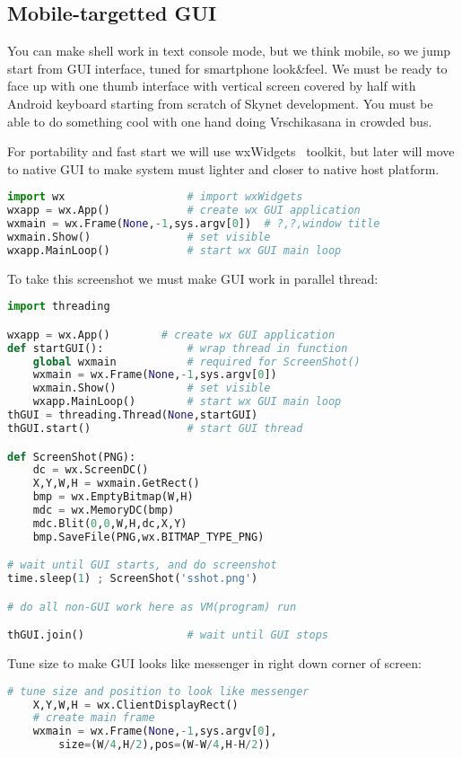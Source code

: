\clearpage
\subsection{Mobile-targetted GUI}
You can make shell work in text console mode, but we think mobile, so we jump
start from GUI interface, tuned for smartphone look\&feel. We must be ready to
face up with one thumb interface with vertical screen covered by half
with Android keyboard starting from scratch of Skynet development. You must be
able to do something cool with one hand doing Vrschikasana in crowded bus.

For portability and fast start we will use wxWidgets \cite{zetwx}\ toolkit,
but later will
move to native GUI to make system must lighter and closer to native host
platform.

\begin{lstlisting}[language=python]
import wx					# import wxWidgets
wxapp = wx.App()			# create wx GUI application
wxmain = wx.Frame(None,-1,sys.argv[0])	# ?,?,window title
wxmain.Show()				# set visible
wxapp.MainLoop()			# start wx GUI main loop
\end{lstlisting}


To take this screenshot we must make GUI work in parallel thread:
\begin{lstlisting}[language=python]
import threading

wxapp = wx.App()		# create wx GUI application
def startGUI():				# wrap thread in function
	global wxmain			# required for ScreenShot()
	wxmain = wx.Frame(None,-1,sys.argv[0])
	wxmain.Show()			# set visible
	wxapp.MainLoop()		# start wx GUI main loop
thGUI = threading.Thread(None,startGUI)
thGUI.start()				# start GUI thread

def ScreenShot(PNG):
	dc = wx.ScreenDC()
	X,Y,W,H = wxmain.GetRect()
	bmp = wx.EmptyBitmap(W,H)
	mdc = wx.MemoryDC(bmp)
	mdc.Blit(0,0,W,H,dc,X,Y)
	bmp.SaveFile(PNG,wx.BITMAP_TYPE_PNG)

# wait until GUI starts, and do screenshot
time.sleep(1) ; ScreenShot('sshot.png')

# do all non-GUI work here as VM(program) run

thGUI.join()				# wait until GUI stops
\end{lstlisting}

Tune size to make GUI looks like messenger in right down corner of screen:
\begin{lstlisting}[language=python]
	# tune size and position to look like messenger
	X,Y,W,H = wx.ClientDisplayRect()
	# create main frame
	wxmain = wx.Frame(None,-1,sys.argv[0],
		size=(W/4,H/2),pos=(W-W/4,H-H/2))
\end{lstlisting}

